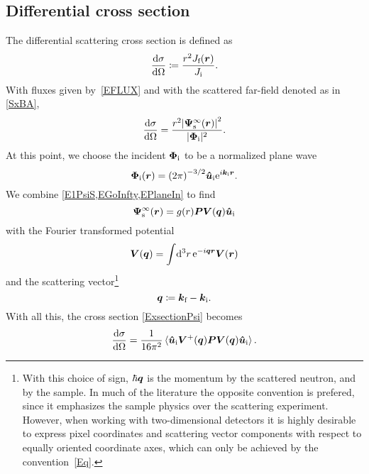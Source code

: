 \subsection{Differential cross section}\label{Sxsect0}

The differential scattering cross section is defined as
%
%
%
%
%
%
\begin{equation}\label{Exsectiondef}
  \xElas
  \coloneqq  \frac{r^2 J_\sf(\r)}{J_\si}.
\end{equation}
%
%
With fluxes given by~\cref{EFLUX}
and with the scattered far-field denoted as in \cref{SxBA},
\begin{equation}\label{ExsectionPsi}
  \xElas
  = \frac{r^2 {|\v\Psi^\infty_\text{s}(\r)|}^2}{|\v\Phi_\si|^2}.
\end{equation}
At this point,
we choose the incident $\bm{\Phi}_{\text{i}}$ to be
a normalized plane wave
\begin{equation}\label{EPlaneIn}
   \v\Phi_\si(\r)
   = {(2\pi)}^{-3/2} \v{\hat u}_\si \e^{i\k_\si\r}.
\end{equation}
We combine \cref{E1PsiS,EGoInfty,EPlaneIn} to find
\begin{equation}\label{E1PsiS2}
  \v\Psi_\text{s}^\infty(\r)
  = g(r) \v{P} \TV(\v{q})\v{\hat u}_\si
\end{equation}
with the Fourier transformed potential
\begin{equation}
  \bm{V}(\bm{q})
  = \int\!\mathrm d^3r\,\mathrm e^{-i\bm{q}\bm{r}}\bm{V}(\bm{r})
\end{equation}
and the scattering vector\footnote
{With this choice of sign,
%
$\hbar\bm{q}$ is the momentum
%
 by the scattered neutron,
and  by the sample.
In much of the literature the opposite convention is prefered,
since it emphasizes the sample physics over the scattering experiment.
However, when working with two-dimensional detectors
it is highly desirable to express pixel coordinates
and scattering vector components
with respect to equally oriented coordinate axes,
which can only be achieved by the convention~\cref{Eq}.}
%
\begin{equation}\label{Eq}
  \q\coloneqq \k_\sf-\k_\si.
\end{equation}
%
With all this, the cross section \cref{ExsectionPsi} becomes
\begin{equation}\label{Exsection}
  \xElas
  = \frac{1}{16\pi^2} \braket{\v{\hat u}_\si\TV^+(\v{q})\v{P}\TV(\v{q})\v{\hat u}_\si}.
\end{equation}

